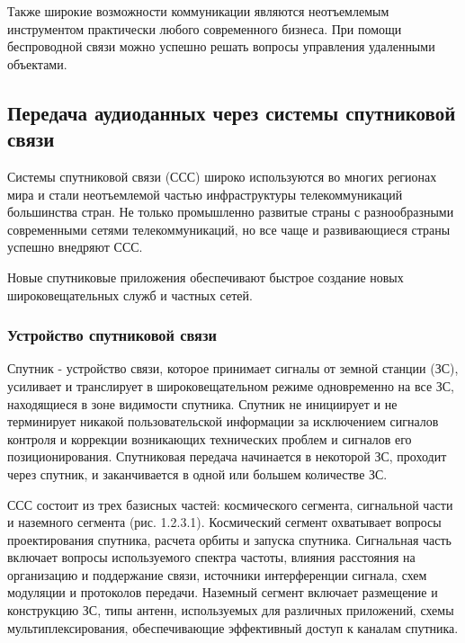 \documentclass[a4paper]{report}
\begin{document}
Также широкие возможности коммуникации являются неотъемлемым инструментом практически любого современного бизнеса. При помощи беспроводной связи можно успешно решать вопросы управления удаленными объектами.


\subsection{Передача аудиоданных через системы спутниковой связи}

Системы спутниковой связи (ССС) широко используются во многих регионах мира и стали неотъемлемой частью инфраструктуры телекоммуникаций большинства стран. Не только промышленно развитые страны с разнообразными современными сетями телекоммуникаций, но все чаще и развивающиеся страны успешно внедряют ССС. 

Новые спутниковые приложения обеспечивают быстрое создание новых широковещательных служб и частных сетей.



\subsubsection{Устройство спутниковой связи}
Спутник - устройство связи, которое принимает сигналы от земной станции (ЗС), усиливает и транслирует в широковещательном режиме одновременно на все ЗС, находящиеся в зоне видимости спутника. Спутник не инициирует и не терминирует никакой пользовательской информации за исключением сигналов контроля и коррекции возникающих технических проблем и сигналов его позиционирования. Спутниковая передача начинается в некоторой ЗС, проходит через спутник, и заканчивается в одной или большем количестве ЗС.

ССС состоит из трех базисных частей: космического сегмента, сигнальной части и наземного сегмента (рис. 1.2.3.1). Космический сегмент охватывает вопросы проектирования спутника, расчета орбиты и запуска спутника. Сигнальная часть включает вопросы используемого спектра частоты, влияния расстояния на организацию и поддержание связи, источники интерференции сигнала, схем модуляции и протоколов передачи. Наземный сегмент включает размещение и конструкцию ЗС, типы антенн, используемых для различных приложений, схемы мультиплексирования, обеспечивающие эффективный доступ к каналам спутника.
\end{document}
